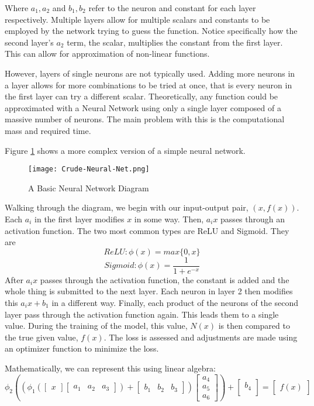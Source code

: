 \documentclass{report}
\begin{document}
Where $a_1, a_2$ and $b_1,b_2$ refer to the neuron and constant for each layer respectively. Multiple layers allow for multiple scalars and constants to be employed by the network trying to guess the function. Notice specifically how the second layer's $a_2$ term, the scalar, multiplies the constant from the first layer. This can allow for approximation of non-linear functions.

However, layers of single neurons are not typically used. Adding more neurons in a layer allows for more combinations to be tried at once, that is every neuron in the first layer can try a different scalar. Theoretically, any function could be approximated with a Neural Network using only a single layer composed of a massive number of neurons. The main problem with this is the computational mass and required time. 

Figure \ref{fig:basicNN} shows a more complex version of a simple neural network.


\begin{figure}[H]
\centering
\texttt{[image: Crude-Neural-Net.png]}
\centering
\caption{A Basic Neural Network Diagram}
\label{fig:basicNN}
\centering
\end{figure}

Walking through the diagram, we begin with our input-output pair, $(x, f(x))$. Each $a_i$ in the first layer modifies $x$ in some way. Then, $a_ix$ passes through an activation function. The two most common types are ReLU and Sigmoid. They are
$$ReLU: \phi(x) = max\{0,x\}$$
$$Sigmoid: \phi(x) = \frac{1}{1+e^{-x}}$$
After $a_ix$ passes through the activation function, the constant is added and the whole thing is submitted to the next layer. Each neuron in layer 2 then modifies this $a_ix+b_1$ in a different way. Finally, each product of the neurons of the second layer pass through the activation function again. This leads them to a single value. During the training of the model, this value, $N(x)$ is then compared to the true given value, $f(x)$. The loss is assessed and adjustments are made using an optimizer function to minimize the loss.

Mathematically, we can represent this using linear algebra:
\begin{equation}
\phi_2\left(
\left(
  \phi_1\left(\begin{bmatrix} x \end{bmatrix} 
  \begin{bmatrix} a_{1} & a_{2} & a_{3} \end{bmatrix} \right)
  + 
  \begin{bmatrix} b_{1} & b_{2} & b_{3} \end{bmatrix}
\right)
 \begin{bmatrix} a_{4} \\ a_{5} \\ a_{6} \end{bmatrix}
\right)
 +
 \begin{bmatrix} b_{4} \\ \end{bmatrix}
 =
 \begin{bmatrix} f(x) \end{bmatrix}
\end{equation}
\end{document}
